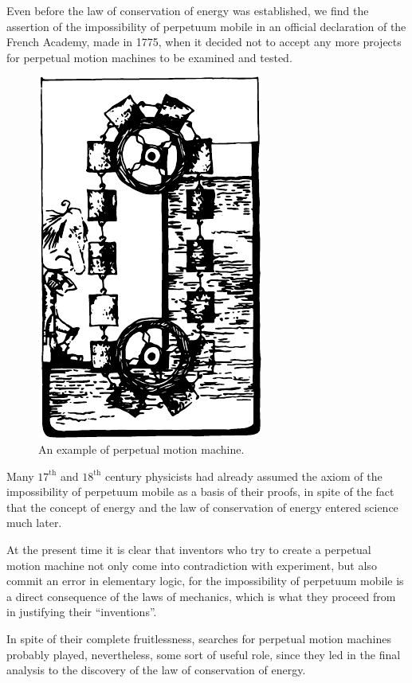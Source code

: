 Even before the law of conservation of energy was established, we find the assertion of the impossibility of perpetuum mobile in an official declaration of the French Academy, made in 1775, when it decided not to accept any more projects for perpetual motion machines to be examined and tested.
\begin{figure}[!ht]
\centering
\includegraphics[height=0.6\textheight]{figures/fig-03-10.pdf}
\caption{An example of perpetual motion machine.}
\label{fig-3.10}
\end{figure}


Many $17^{\textrm{th}}$ and $18^{\textrm{th}}$ century physicists had already
assumed the axiom of the impossibility of perpetuum mobile as a basis of their proofs, in spite of the fact that the
concept of energy and the law of conservation of energy
entered science much later.

At the present time it is clear that inventors who try
to create a perpetual motion machine not only come into contradiction with experiment, but also commit an error
in elementary logic, for the impossibility of perpetuum
mobile is a direct consequence of the laws of mechanics, which is what they proceed from in justifying their ``inventions''.

In spite of their complete fruitlessness, searches for
perpetual motion machines probably played, nevertheless, some sort of useful role, since they led in the final analysis to the discovery of the law of conservation of energy.


